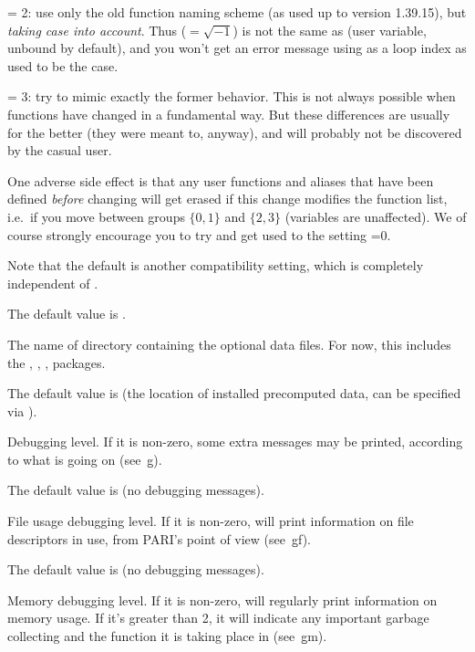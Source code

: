 \quad {} = 2: use only the old function naming scheme (as
used up to version 1.39.15), but \emph{taking case into account}. Thus
 (${}=\sqrt{-1}$) is not the same as  (user variable, unbound
by default), and you won't get an error message using  as a loop
index as used to be the case.

\quad {} = 3: try to mimic exactly the former behavior. This
is not always possible when functions have changed in a fundamental way.
But these differences are usually for the better (they were meant to,
anyway), and will probably not be discovered by the casual user.

One adverse side effect is that any user functions and aliases that have
been defined \emph{before} changing  will get erased if this
change modifies the function list, i.e.~if you move between groups
$\{0,1\}$ and $\{2,3\}$ (variables are unaffected). We of course strongly
encourage you to try and get used to the setting =0.

Note that the default  is another compatibility setting,
which is completely independent of .

The default value is .

\label{se:def,datadir}
The name of directory containing the optional data files. For now,
this includes the , , , 
packages.

The default value is \datadir (the location of installed precomputed data,
can be specified via ).

\label{se:def,debug}
Debugging level. If it is non-zero, some extra messages may be printed,
according to what is going on (see~\b{g}).

The default value is  (no debugging messages).

\label{se:def,debugfiles}
File usage debugging level. If it is non-zero,  will print
information on file descriptors in use, from PARI's point of view
(see~\b{gf}).

The default value is  (no debugging messages).

\label{se:def,debugmem}
Memory debugging level. If it is non-zero,  will regularly print
information on memory usage. If it's greater than 2, it will indicate any
important garbage collecting and the function it is taking place in
(see~\b{gm}).

